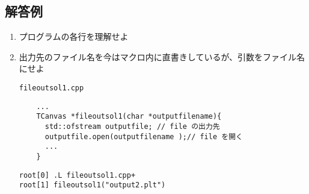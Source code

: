 \subsection{解答例}
\begin{enumerate}
\item プログラムの各行を理解せよ

\item 出力先のファイル名を今はマクロ内に直書きしているが、引数をファイル名にせよ
      
      \begin{itembox}{\texttt{fileoutsol1.cpp}}
\begin{verbatim}
	...
	TCanvas *fileoutsol1(char *outputfilename){
	  std::ofstream outputfile; // file の出力先
	  outputfile.open(outputfilename );// file を開く
	  ...
	}
\end{verbatim}
      \end{itembox}
      
\begin{verbatim}
root[0] .L fileoutsol1.cpp+
root[1] fileoutsol1("output2.plt") 
\end{verbatim} 

\end{enumerate}